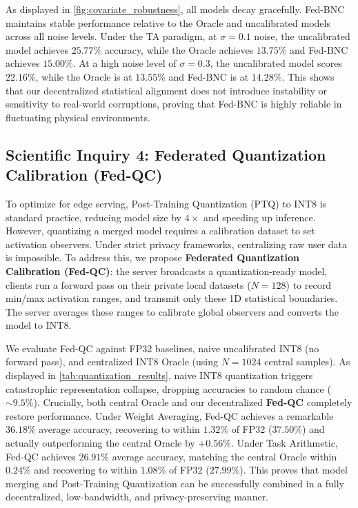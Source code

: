 \documentclass{article}
\theoremstyle{plain}
\theoremstyle{definition}
\theoremstyle{remark}
\begin{document}
As displayed in \cref{fig:covariate_robustness}, all models decay gracefully. Fed-BNC maintains stable performance relative to the Oracle and uncalibrated models across all noise levels. Under the TA paradigm, at $\sigma=0.1$ noise, the uncalibrated model achieves $25.77\%$ accuracy, while the Oracle achieves $13.75\%$ and Fed-BNC achieves $15.00\%$. At a high noise level of $\sigma=0.3$, the uncalibrated model scores $22.16\%$, while the Oracle is at $13.55\%$ and Fed-BNC is at $14.28\%$. This shows that our decentralized statistical alignment does not introduce instability or sensitivity to real-world corruptions, proving that Fed-BNC is highly reliable in fluctuating physical environments.

\subsection{Scientific Inquiry 4: Federated Quantization Calibration (Fed-QC)}
To optimize for edge serving, Post-Training Quantization (PTQ) to INT8 is standard practice, reducing model size by $4\times$ and speeding up inference. However, quantizing a merged model requires a calibration dataset to set activation observers. Under strict privacy frameworks, centralizing raw user data is impossible. To address this, we propose \textbf{Federated Quantization Calibration (Fed-QC)}: the server broadcasts a quantization-ready model, clients run a forward pass on their private local datasets ($N\!=\!128$) to record min/max activation ranges, and transmit only these 1D statistical boundaries. The server averages these ranges to calibrate global observers and converts the model to INT8.

We evaluate Fed-QC against FP32 baselines, naive uncalibrated INT8 (no forward pass), and centralized INT8 Oracle (using $N\!=\!1024$ central samples). As displayed in \cref{tab:quantization_results}, naive INT8 quantization triggers catastrophic representation collapse, dropping accuracies to random chance ($\sim 9.5\%$). Crucially, both central Oracle and our decentralized \textbf{Fed-QC} completely restore performance. Under Weight Averaging, Fed-QC achieves a remarkable \textbf{$36.18\%$} average accuracy, recovering to within $1.32\%$ of FP32 ($37.50\%$) and actually outperforming the central Oracle by $+0.56\%$. Under Task Arithmetic, Fed-QC achieves \textbf{$26.91\%$} average accuracy, matching the central Oracle within $0.24\%$ and recovering to within $1.08\%$ of FP32 ($27.99\%$). This proves that model merging and Post-Training Quantization can be successfully combined in a fully decentralized, low-bandwidth, and privacy-preserving manner.
\end{document}
